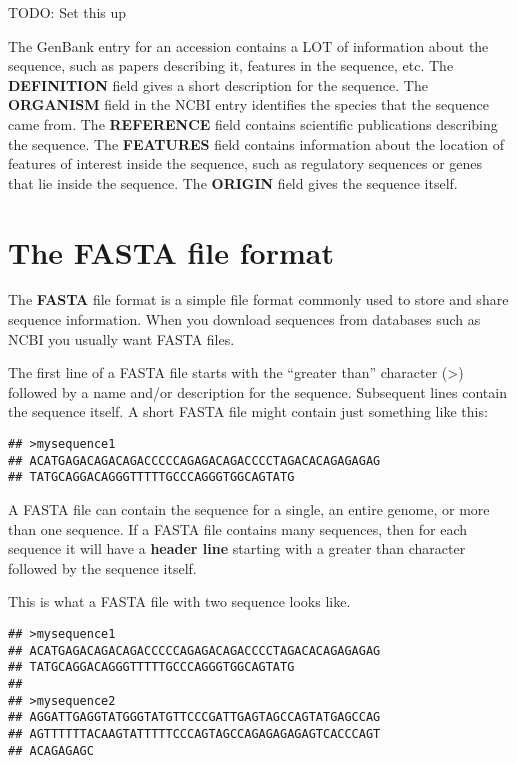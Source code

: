 \documentclass[
]{book}
\begin{document}
TODO: Set this up

The GenBank entry for an accession contains a LOT of information about the sequence, such as papers describing it, features in the sequence, etc. The \textbf{DEFINITION} field gives a short description for the sequence. The \textbf{ORGANISM} field in the NCBI entry identifies the species that the sequence came from. The \textbf{REFERENCE} field contains scientific publications describing the sequence. The \textbf{FEATURES} field contains information about the location of features of interest inside the sequence, such as regulatory sequences or genes that lie inside the sequence. The \textbf{ORIGIN} field gives the sequence itself.

\hypertarget{the-fasta-file-format}{%
\section{The FASTA file format}\label{the-fasta-file-format}}

The \textbf{FASTA} file format is a simple file format commonly used to store and share sequence information. When you download sequences from databases such as NCBI you usually want FASTA files.

The first line of a FASTA file starts with the ``greater than'' character (\textgreater) followed by a name and/or description for the sequence. Subsequent lines contain the sequence itself. A short FASTA file might contain just something like this:

\begin{verbatim}
## >mysequence1
## ACATGAGACAGACAGACCCCCAGAGACAGACCCCTAGACACAGAGAGAG
## TATGCAGGACAGGGTTTTTGCCCAGGGTGGCAGTATG
\end{verbatim}

A FASTA file can contain the sequence for a single, an entire genome, or more than one sequence. If a FASTA file contains many sequences, then for each sequence it will have a \textbf{header line} starting with a greater than character followed by the sequence itself.

This is what a FASTA file with two sequence looks like.

\begin{verbatim}
## >mysequence1
## ACATGAGACAGACAGACCCCCAGAGACAGACCCCTAGACACAGAGAGAG
## TATGCAGGACAGGGTTTTTGCCCAGGGTGGCAGTATG
## 
## >mysequence2
## AGGATTGAGGTATGGGTATGTTCCCGATTGAGTAGCCAGTATGAGCCAG
## AGTTTTTTACAAGTATTTTTCCCAGTAGCCAGAGAGAGAGTCACCCAGT
## ACAGAGAGC
\end{verbatim}
\end{document}
